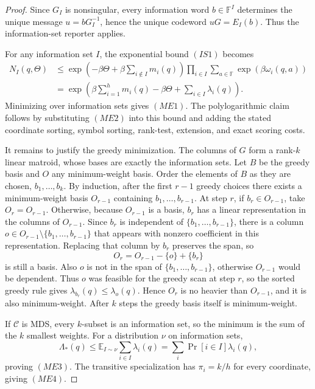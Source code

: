 \documentclass[10pt]{article}
\theoremstyle{definition}
\newcommand{\E}{\mathbb{E}}
\begin{document}
\begin{proof}
   Since \(G_I\) is nonsingular, every information word \(b\in\mathbb F^I\)
   determines the unique message \(u=bG_I^{-1}\), hence the unique codeword
   \(uG=E_I(b)\).  Thus the information-set reporter applies.

   For any information set \(I\), the exponential bound \((IS1)\) becomes
   \[
   \begin{aligned}
      N_I(q,\Theta)
      &\le
      \exp\!\left(
         -\beta\Theta+\beta\sum_{i\notin I}m_i(q)
      \right)
      \prod_{i\in I}
      \sum_{a\in\mathbb F}\exp(\beta\omega_i(q,a))\\
      &=
      \exp\!\left(
         \beta\sum_{i=1}^hm_i(q)-\beta\Theta
         +
         \sum_{i\in I}\lambda_i(q)
      \right).
   \end{aligned}
   \]
   Minimizing over information sets gives \((ME1)\).  The polylogarithmic
   claim follows by substituting \((ME2)\) into this bound and adding the
   stated coordinate sorting, symbol sorting, rank-test, extension, and exact
   scoring costs.

   It remains to justify the greedy minimization.  The columns of \(G\) form a
   rank-\(k\) linear matroid, whose bases are exactly the information sets.
   Let \(B\) be the greedy basis and \(O\) any minimum-weight basis.  Order the
   elements of \(B\) as they are chosen, \(b_1,\ldots,b_k\).  By induction,
   after the first \(r-1\) greedy choices there exists a minimum-weight basis
   \(O_{r-1}\) containing \(b_1,\ldots,b_{r-1}\).  At step \(r\), if
   \(b_r\in O_{r-1}\), take \(O_r=O_{r-1}\).  Otherwise, because
   \(O_{r-1}\) is a basis, \(b_r\) has a linear representation in the columns
   of \(O_{r-1}\).  Since \(b_r\) is independent of
   \(\{b_1,\ldots,b_{r-1}\}\), there is a column
   \(o\in O_{r-1}\setminus\{b_1,\ldots,b_{r-1}\}\) that appears with nonzero
   coefficient in this representation.  Replacing that column by \(b_r\)
   preserves the span, so
   \[
      O_r=O_{r-1}-\{o\}+\{b_r\}
   \]
   is still a basis.  Also \(o\) is not in the span of
   \(\{b_1,\ldots,b_{r-1}\}\), otherwise \(O_{r-1}\) would be dependent.  Thus
   \(o\) was feasible for the greedy scan at step \(r\), so the sorted greedy
   rule gives
   \(\lambda_{b_r}(q)\le\lambda_o(q)\).  Hence \(O_r\) is no heavier than
   \(O_{r-1}\), and it is also minimum-weight.  After \(k\) steps the greedy
   basis itself is minimum-weight.

   If \(\mathcal C\) is MDS, every \(k\)-subset is an information set, so the
   minimum is the sum of the \(k\) smallest weights.  For a distribution
   \(\nu\) on information sets,
   \[
      \Lambda_*(q)
      \le
      \E_{I\sim\nu}\sum_{i\in I}\lambda_i(q)
      =
      \sum_i\Pr[i\in I]\lambda_i(q),
   \]
   proving \((ME3)\).  The transitive specialization has
   \(\pi_i=k/h\) for every coordinate, giving \((ME4)\).
\end{proof}
\end{document}
